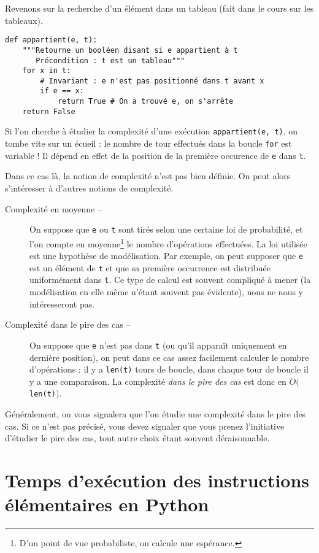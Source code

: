 Revenons sur la recherche d'un élément dans un tableau (fait dans le cours sur les tableaux). 

\begin{lstlisting}
def appartient(e, t):
    """Retourne un booléen disant si e appartient à t
       Précondition : t est un tableau"""
    for x in t:
        # Invariant : e n'est pas positionné dans t avant x
        if e == x:
            return True # On a trouvé e, on s'arrête
    return False
\end{lstlisting}

Si l'on cherche à étudier la complexité d'une exécution \texttt{appartient(e, t)}, on tombe vite sur un écueil : le nombre de tour effectués dans la boucle \texttt{for} est variable ! 
Il dépend en effet de la position de la première occurence de \texttt{e} dans \texttt{t}. 

Dans ce cas là, la notion de complexité n'est pas bien définie. On peut alors s'intéresser à d'autres notions de complexité. 

\begin{description}
  \item[Complexité en moyenne --] On suppose que \texttt{e} ou \texttt{t} sont tirés selon une certaine loi 
de probabilité, et l'on compte \og en moyenne\footnote{D'un point de vue probabiliste, on calcule une 
espérance.} \fg{} le nombre d'opérations effectuées. 
    La loi utilisée est une hypothèse de modélisation. Par exemple, on peut supposer que \texttt{e} est un élément de \texttt{t} et que sa première occurrence est distribuée uniformément dans \texttt{t}. 
    Ce type de calcul est souvent compliqué à mener (la modélisation en elle même n'étant souvent pas évidente), nous ne nous y intéresseront pas. 
  \item[Complexité dans le pire des cas --] On suppose que \texttt{e} n'est pas dans \texttt{t} (ou qu'il apparaît uniquement en dernière position), on peut dans ce cas assez facilement calculer le nombre d'opérations : 
    il y a \texttt{len(t)} tours de boucle, dans chaque tour de boucle il y a une comparaison. La complexité \emph{dans le pire des cas} est donc en $O($\texttt{len(t)}$)$.
\end{description}

Généralement, on vous signalera que l'on étudie une complexité dans le pire des cas. Si ce n'est pas précisé, vous devez signaler que vous prenez l'initiative d'étudier le pire des cas, tout autre choix étant souvent déraisonnable. 

\section{Temps d'exécution des instructions élémentaires en Python}

